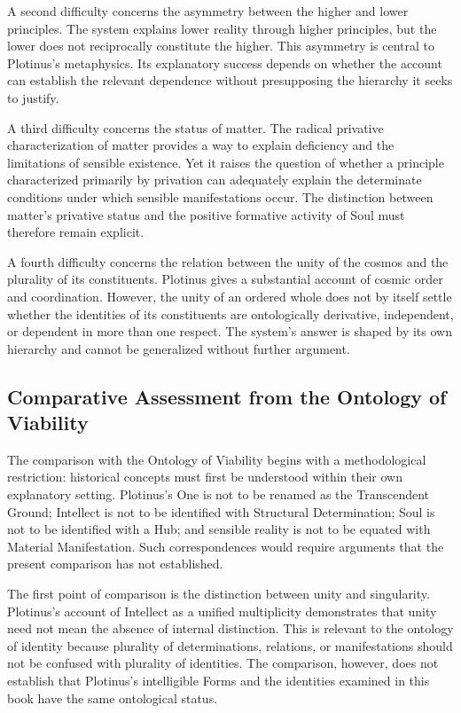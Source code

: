 \label{para:VS.B01.P01.C08.S06.SS08.P003}
A second difficulty concerns the asymmetry between the higher and
lower principles. The system explains lower reality through higher
principles, but the lower does not reciprocally constitute the higher.
This asymmetry is central to Plotinus's metaphysics. Its explanatory
success depends on whether the account can establish the relevant
dependence without presupposing the hierarchy it seeks to justify.

\label{para:VS.B01.P01.C08.S06.SS08.P004}
A third difficulty concerns the status of matter. The radical
privative characterization of matter provides a way to explain
deficiency and the limitations of sensible existence. Yet it raises
the question of whether a principle characterized primarily by
privation can adequately explain the determinate conditions under
which sensible manifestations occur. The distinction between
matter's privative status and the positive formative activity of
Soul must therefore remain explicit.

\label{para:VS.B01.P01.C08.S06.SS08.P005}
A fourth difficulty concerns the relation between the unity of the
cosmos and the plurality of its constituents. Plotinus gives a
substantial account of cosmic order and coordination. However,
the unity of an ordered whole does not by itself settle whether
the identities of its constituents are ontologically derivative,
independent, or dependent in more than one respect. The system's
answer is shaped by its own hierarchy and cannot be generalized
without further argument.

\subsection{Comparative Assessment from the Ontology of Viability}
\label{subsec:ch08-plotinus-comparative-assessment}

\label{para:VS.B01.P01.C08.S06.SS09.P001}
The comparison with the Ontology of Viability begins with a
methodological restriction: historical concepts must first be
understood within their own explanatory setting. Plotinus's One
is not to be renamed as the Transcendent Ground; Intellect is not
to be identified with Structural Determination; Soul is not to be
identified with a Hub; and sensible reality is not to be equated
with Material Manifestation. Such correspondences would require
arguments that the present comparison has not established.

\label{para:VS.B01.P01.C08.S06.SS09.P002}
The first point of comparison is the distinction between unity
and singularity. Plotinus's account of Intellect as a unified
multiplicity demonstrates that unity need not mean the absence
of internal distinction. This is relevant to the ontology of
identity because plurality of determinations, relations, or
manifestations should not be confused with plurality of identities.
The comparison, however, does not establish that Plotinus's
intelligible Forms and the identities examined in this book have
the same ontological status.

